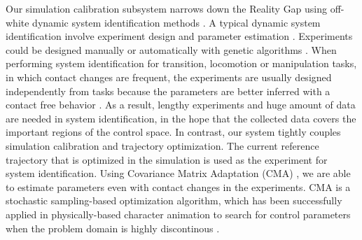 Our simulation calibration subsystem narrows down the Reality Gap using off-white dynamic system identification methods \cite{ljung:2010}. A typical dynamic system identification involve experiment design and parameter estimation \cite{swevers:2007}. Experiments could be designed manually or automatically with genetic algorithms \cite{BongardL05}. When performing system identification for transition, locomotion or manipulation tasks, in which contact changes are frequent, the experiments are usually designed independently from tasks because the parameters are better inferred with a contact free behavior \cite{Kolev:2015}. As a result, lengthy experiments and huge amount of data are needed in system identification, in the hope that the collected data covers the important regions of the control space. In contrast, our system tightly couples simulation calibration and trajectory optimization. The current reference trajectory that is optimized in the simulation is used as the experiment for system identification. Using Covariance Matrix Adaptation (CMA) \cite{Hansen:2009}, we are able to estimate parameters even with contact changes in the experiments. CMA is a stochastic sampling-based optimization algorithm, which has been successfully applied in physically-based character animation to search for control parameters when the problem domain is highly discontinous \cite{Wu:2010, Wang:2010, Tan:2014}.



